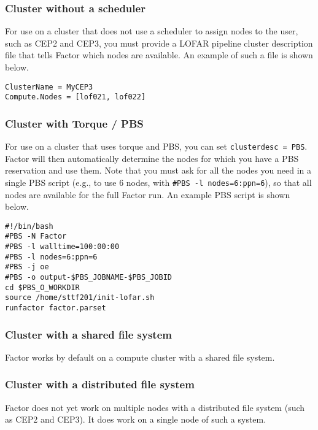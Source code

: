 \documentclass[structabstract]{article}
\begin{document}
\subsubsection{Cluster without a scheduler}
For use on a cluster that does not use a scheduler to assign nodes to the user,
such as CEP2 and CEP3, you must provide a LOFAR pipeline cluster description
file that tells Factor which nodes are available. An example of such a file is
shown below.

\begin{verbatim}
ClusterName = MyCEP3
Compute.Nodes = [lof021, lof022]
\end{verbatim}

\subsubsection{Cluster with Torque / PBS }
For use on a cluster that uses torque and PBS, you can set {\tt clusterdesc =
PBS}. Factor will then automatically determine the nodes for which you have a
PBS reservation and use them. Note that you must ask for all the nodes you need
in a single PBS script (e.g., to use 6 nodes, with {\tt \#PBS -l
nodes=6:ppn=6}), so that all nodes are available for the full Factor run. An
example PBS script is shown below.

\begin{verbatim}
#!/bin/bash
#PBS -N Factor
#PBS -l walltime=100:00:00
#PBS -l nodes=6:ppn=6
#PBS -j oe
#PBS -o output-$PBS_JOBNAME-$PBS_JOBID
cd $PBS_O_WORKDIR
source /home/sttf201/init-lofar.sh
runfactor factor.parset
\end{verbatim}

\subsubsection{Cluster with a shared file system}
Factor works by default on a compute cluster with a shared file system.

\subsubsection{Cluster with a distributed file system}
Factor does not yet work on multiple nodes with a distributed file system (such
as CEP2 and CEP3). It does work on a single node of such a system.
\end{document}
